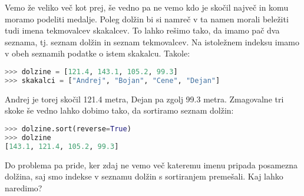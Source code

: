 Vemo že veliko več kot prej, še vedno pa ne vemo kdo je skočil največ in komu moramo podeliti medalje. Poleg dolžin bi si namreč v ta namen morali beležiti tudi imena tekmovalcev skakalcev. To lahko rešimo tako, da imamo pač dva seznama, tj. seznam dolžin in seznam tekmovalcev. Na istoležnem indeksu imamo v obeh seznamih podatke o istem skakalcu. Takole:
\begin{lstlisting}[language=Python]
>>> dolzine = [121.4, 143.1, 105.2, 99.3]
>>> skakalci = ["Andrej", "Bojan", "Cene", "Dejan"]
\end{lstlisting}
Andrej je torej skočil 121.4 metra, Dejan pa zgolj 99.3 metra. Zmagovalne tri skoke še vedno lahko dobimo tako, da sortiramo seznam dolžin:
\begin{lstlisting}[language=Python]
>>> dolzine.sort(reverse=True)
>>> dolzine
[143.1, 121.4, 105.2, 99.3]
\end{lstlisting}
Do problema pa pride, ker zdaj ne vemo več kateremu imenu pripada posamezna dolžina, saj smo indekse v seznamu dolžin s sortiranjem premešali. Kaj lahko naredimo? 

